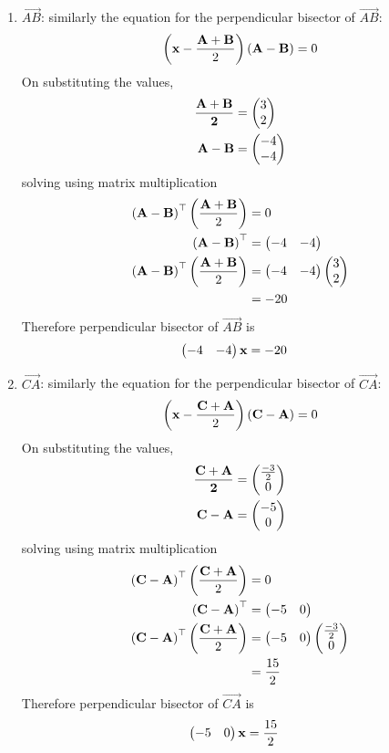 \documentclass[11pt]{book}
\begin{document}
\begin{enumerate}[label=\thesection.\arabic*.,ref=\thesection.\theenumi]
\begin{enumerate}
  \item $\vec{AB}$: similarly the equation for the perpendicular bisector of $\vec{AB}$:
\begin{align}
    \left(\mathbf{x}-\frac{\mathbf{A}+\mathbf{B}}{2}\right)\left(\mathbf{A}-\mathbf{B}\right) = 0
\end{align}
On substituting the values,
\begin{align}
    \mathbf{\frac{\mathbf{A}+\mathbf{B}}{2}} &= \begin{pmatrix}3\\ 2\end{pmatrix} \\
\mathbf{A}-\mathbf{B} &= \begin{pmatrix}-4 \\ -4\end{pmatrix} \\
\end{align}
solving using matrix multiplication
\begin{align}
\left(\mathbf{A}-\mathbf{B}\right)^{\top}\left(\frac{\mathbf{A}+\mathbf{B}}{2}\right)&=0 \\
\left(\mathbf{A}-\mathbf{B}\right)^{\top} &= \begin{pmatrix}-4 & -4\end{pmatrix} \\
\left(\mathbf{A}-\mathbf{B}\right)^{\top}\left(\frac{\mathbf{A}+\mathbf{B}}{2}\right)&=\begin{pmatrix}-4 & -4\end{pmatrix}\begin{pmatrix}3 \\ 2\end{pmatrix}\\
&= -20
\end{align}
Therefore perpendicular bisector of $\vec{AB}$ is
\begin{align}
    \begin{pmatrix}-4 & -4\end{pmatrix}\mathbf{x}&= -20
\end{align}

  \item $\vec{CA}$: similarly the equation for the perpendicular bisector of $\vec{CA}$:
\begin{align}
    \left(\mathbf{x}-\frac{\mathbf{C}+\mathbf{A}}{2}\right)\left(\mathbf{C}-\mathbf{A}\right) = 0
\end{align}
On substituting the values,
\begin{align}
    \mathbf{\frac{\mathbf{C}+\mathbf{A}}{2}} &= \begin{pmatrix}\frac{-3}{2} \\ 0\end{pmatrix} \\
\mathbf{C}-\mathbf{A} &= \begin{pmatrix}-5\\ 0\end{pmatrix} \\
\end{align}
solving using matrix multiplication
\begin{align}
\left(\mathbf{C}-\mathbf{A}\right)^{\top}\left(\frac{\mathbf{C}+\mathbf{A}}{2}\right)&=0 \\
\left(\mathbf{C}-\mathbf{A}\right)^{\top} &= \begin{pmatrix}-5 & 0\end{pmatrix} \\
\left(\mathbf{C}-\mathbf{A}\right)^{\top}\left(\frac{\mathbf{C}+\mathbf{A}}{2}\right)&=\begin{pmatrix}-5 & 0\end{pmatrix}\begin{pmatrix}\frac{-3}{2} \\ 0\end{pmatrix}\\
&= \frac{15}{2}
\end{align}
Therefore perpendicular bisector of $\vec{CA}$ is
\begin{align}
    \begin{pmatrix}-5 & 0\end{pmatrix}\mathbf{x}&= \frac{15}{2}
\end{align}
\end{enumerate}


\end{enumerate}
\end{document}
